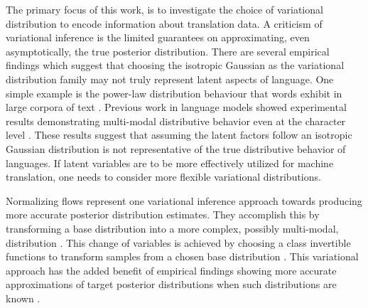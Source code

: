 
The primary focus of this work, is to investigate the choice of variational distribution to encode information about translation data. A criticism of variational inference is the limited guarantees on approximating, even asymptotically, the true posterior distribution. There are several empirical findings which suggest that choosing the isotropic Gaussian as the variational distribution family may not truly represent latent aspects of language. One simple example is the power-law distribution behaviour that words exhibit in large corpora of text \cite{koehnSMT2010}. Previous work in language models showed experimental results demonstrating multi-modal distributive behavior even at the character level \cite{ziegler2019LatentNFforDiscrete}. These results suggest that assuming the latent factors follow an isotropic Gaussian distribution is not representative of the true distributive behavior of languages. If latent variables are to be more effectively utilized for machine translation, one needs to consider more flexible variational distributions. 

Normalizing flows represent one variational inference approach towards producing more accurate posterior distribution estimates. They accomplish this by transforming a base distribution into a more complex, possibly multi-modal, distribution \cite{tabak2010densityestimationdual,tabak2013familyofnonparametricdensity}. This change of variables is achieved by choosing a class invertible functions to transform samples from a chosen base distribution \cite{rezende2015VIwithNF}. This variational approach has the added benefit of empirical findings showing more accurate approximations of target posterior distributions when such distributions are known \cite{rezende2015VIwithNF}.

